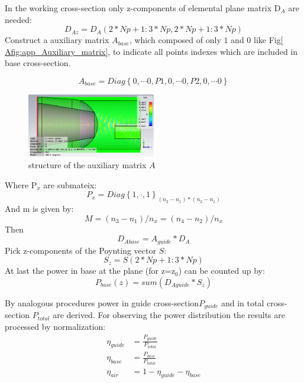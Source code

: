 In the working cross-section only z-components of elemental plane matrix D$_{A}$ are needed:
\begin{equation}
D_{Az}=D_{A}(2*Np+1:3*Np, 2*Np+1:3*Np)
\label{Aeq:daz_matrix}
\end{equation}
Construct a auxiliary matrix $A_{base}$, which composed of only $1$ and $0$ like Fig\quad\ref{ Afig:app_Auxiliary_matrix}, to indicate all points indexes which are included in base cross-section. 

\begin{equation}
A_{base}=Diag\left\{0,\cdots 0,P1,0,\cdots 0,P2,0,\cdots 0\right\}
\label{Aeq:A_matrix}
\end{equation}

\begin{figure}[ht]
\centering
\includegraphics[width=0.5\textwidth]{bilder/basic_waveguide_efield}
\caption{structure of the auxiliary matrix $A$}
\label{Afig:app_Auxiliary_matrix}
\end{figure}
Where P$_{x}$ are submateix:
\begin{equation}
P_{x}=Diag\left\{1,\cdot,1\right\}_{(n_{2}-n_{1})*(n_{2}-n_{1})}
\end{equation}
And m is given by:
\begin{equation}
M=(n_{3}-n_{1})/n_{x}=(n_{4}-n_{2})/n_{x}
\end{equation}
Then 
\begin{equation}
D_{Abase}=A_{guide}*D_{A}
\end{equation}
Pick z-components of the Poynting vector $S$:
\begin{equation}
S_{z}=S(2*Np+1:3*Np)
\end{equation}
At last the power in base at the plane (for z=z$_{0}$) can be counted up by:
\begin{equation}
P_{base}(z)=sum(D_{Aguide}*S_{z})
\end{equation}

By analogous procedures power in guide cross-section$P_{guide}$ and in total cross-section $P_{total}$ are derived. For observing the power distribution the results are processed by normalization:
\begin{align}
\eta_{guide}&=\frac{P_{guide}}{P_{total}}\\
\eta_{base}&=\frac{P_{base}}{P_{total}}\\
\eta_{air}&=1-\eta_{guide}-\eta_{base}
\end{align}

